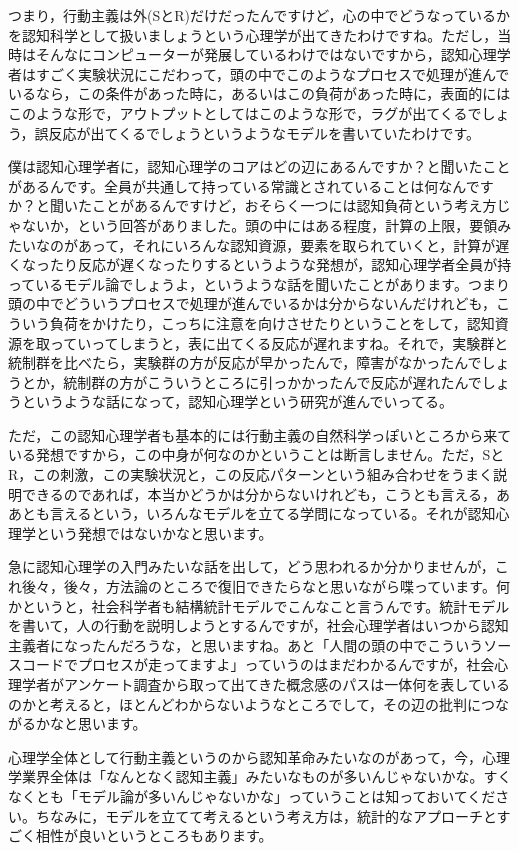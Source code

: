 \documentclass{ltjsbook}
\begin{document}
つまり，行動主義は外(SとR)だけだったんですけど，心の中でどうなっているかを認知科学として扱いましょうという心理学が出てきたわけですね。ただし，当時はそんなにコンピューターが発展しているわけではないですから，認知心理学者はすごく実験状況にこだわって，頭の中でこのようなプロセスで処理が進んでいるなら，この条件があった時に，あるいはこの負荷があった時に，表面的にはこのような形で，アウトプットとしてはこのような形で，ラグが出てくるでしょう，誤反応が出てくるでしょうというようなモデルを書いていたわけです。

僕は認知心理学者に，認知心理学のコアはどの辺にあるんですか？と聞いたことがあるんです。全員が共通して持っている常識とされていることは何なんですか？と聞いたことがあるんですけど，おそらく一つには認知負荷という考え方じゃないか，という回答がありました。頭の中にはある程度，計算の上限，要領みたいなのがあって，それにいろんな認知資源，要素を取られていくと，計算が遅くなったり反応が遅くなったりするというような発想が，認知心理学者全員が持っているモデル論でしょうよ，というような話を聞いたことがあります。つまり頭の中でどういうプロセスで処理が進んでいるかは分からないんだけれども，こういう負荷をかけたり，こっちに注意を向けさせたりということをして，認知資源を取っていってしまうと，表に出てくる反応が遅れますね。それで，実験群と統制群を比べたら，実験群の方が反応が早かったんで，障害がなかったんでしょうとか，統制群の方がこういうところに引っかかったんで反応が遅れたんでしょうというような話になって，認知心理学という研究が進んでいってる。

ただ，この認知心理学者も基本的には行動主義の自然科学っぽいところから来ている発想ですから，この中身が何なのかということは断言しません。ただ，SとR，この刺激，この実験状況と，この反応パターンという組み合わせをうまく説明できるのであれば，本当かどうかは分からないけれども，こうとも言える，ああとも言えるという，いろんなモデルを立てる学問になっている。それが認知心理学という発想ではないかなと思います。

急に認知心理学の入門みたいな話を出して，どう思われるか分かりませんが，これ後々，後々，方法論のところで復旧できたらなと思いながら喋っています。何かというと，社会科学者も結構統計モデルでこんなこと言うんです。統計モデルを書いて，人の行動を説明しようとするんですが，社会心理学者はいつから認知主義者になったんだろうな，と思いますね。あと「人間の頭の中でこういうソースコードでプロセスが走ってますよ」っていうのはまだわかるんですが，社会心理学者がアンケート調査から取って出てきた概念感のパスは一体何を表しているのかと考えると，ほとんどわからないようなところでして，その辺の批判につながるかなと思います。

心理学全体として行動主義というのから認知革命みたいなのがあって，今，心理学業界全体は「なんとなく認知主義」みたいなものが多いんじゃないかな。すくなくとも「モデル論が多いんじゃないかな」っていうことは知っておいてください。ちなみに，モデルを立てて考えるという考え方は，統計的なアプローチとすごく相性が良いというところもあります。
\end{document}
